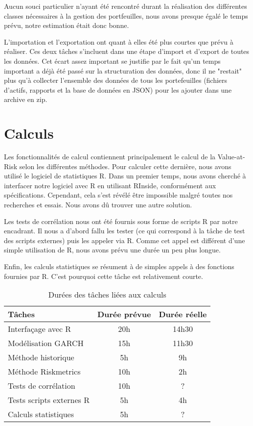\documentclass[a4paper]{report}
\begin{document}
Aucun souci particulier n'ayant été rencontré durant la réalisation des différentes classes nécessaires à la gestion des portfeuilles, nous avons presque égalé le temps prévu, notre estimation était donc bonne.

L'importation et l'exportation ont quant à elles été plus courtes que prévu à réaliser.
Ces deux tâches s'incluent dans une étape d'import et d'export de toutes les données.
Cet écart assez important se justifie par le fait qu'un temps important a déjà été passé sur la structuration des données, donc il ne "restait" plus qu'à collecter l'ensemble des données de tous les portefeuilles (fichiers d'actifs, rapports et la base de données en JSON) pour les ajouter dans une archive en zip.

\section{Calculs}
Les fonctionnalités de calcul contiennent principalement le calcul de la Value-at-Risk selon les différentes méthodes.
Pour calculer cette dernière, nous avons utilisé le logiciel de statistiques R.
Dans un premier temps, nous avons cherché à interfacer notre logiciel avec R en utilisant RInside, conformément aux spécifications.
Cependant, cela s'est révélé être impossible malgré toutes nos recherches et essais.
Nous avons dû trouver une autre solution.

Les tests de corrélation nous ont été fournis sous forme de scripts R par notre encadrant.
Il nous a d'abord fallu les tester (ce qui correspond à la tâche de test des scripts externes) puis les appeler via R.
Comme cet appel est différent d'une simple utilisation de R, nous avons prévu une durée un peu plus longue.

Enfin, les calculs statistiques se résument à de simples appels à des fonctions fournies par R.
C'est pourquoi cette tâche est relativement courte.

\begin{table}[H]
\centering
  \begin{tabularx}{0.8\textwidth}{| X | c | c |}
    \hline
	Tâches & Durée prévue & Durée réelle \\
    \hline
    Interfaçage avec R &  20h  & 14h30\\
    Modélisation GARCH &  15h & 11h30\\
    Méthode historique &  5h & 9h\\
    Méthode Riskmetrics &  10h & 2h\\
    Tests de corrélation &  10h & ?\\
    Tests scripts externes R & 5h & 4h\\
    Calculs statistiques &  5h & ?\\
    \hline
  \end{tabularx}
  \caption{Durées des tâches liées aux calculs}
\end{table}
\end{document}
